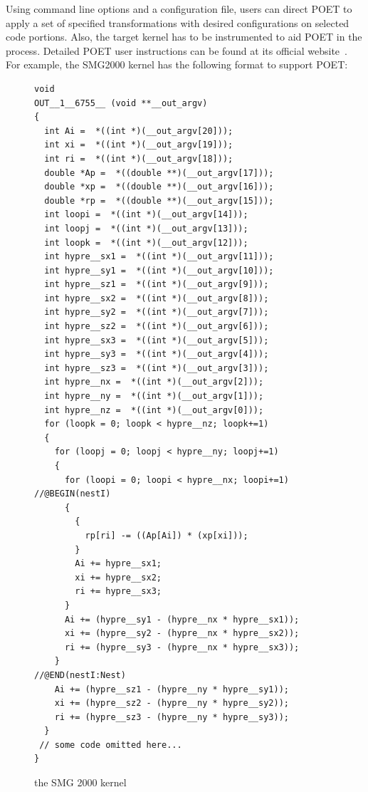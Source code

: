 Using command line options and a configuration file, users can direct POET to apply a set
of specified transformations with desired configurations on selected code portions. 
Also, the target kernel has to be instrumented to aid POET in the process. 
Detailed POET user instructions can be found at its official website~\cite{poetWeb}.
For example, the SMG2000 kernel has the following format to support
POET:
\begin{figure}[!ht]
\centering
\lstset{language=C, basicstyle=\scriptsize}
\begin{lstlisting}
void
OUT__1__6755__ (void **__out_argv)
{
  int Ai =  *((int *)(__out_argv[20]));
  int xi =  *((int *)(__out_argv[19]));
  int ri =  *((int *)(__out_argv[18]));
  double *Ap =  *((double **)(__out_argv[17]));
  double *xp =  *((double **)(__out_argv[16]));
  double *rp =  *((double **)(__out_argv[15]));
  int loopi =  *((int *)(__out_argv[14]));
  int loopj =  *((int *)(__out_argv[13]));
  int loopk =  *((int *)(__out_argv[12]));
  int hypre__sx1 =  *((int *)(__out_argv[11]));
  int hypre__sy1 =  *((int *)(__out_argv[10]));
  int hypre__sz1 =  *((int *)(__out_argv[9]));
  int hypre__sx2 =  *((int *)(__out_argv[8]));
  int hypre__sy2 =  *((int *)(__out_argv[7]));
  int hypre__sz2 =  *((int *)(__out_argv[6]));
  int hypre__sx3 =  *((int *)(__out_argv[5]));
  int hypre__sy3 =  *((int *)(__out_argv[4]));
  int hypre__sz3 =  *((int *)(__out_argv[3]));
  int hypre__nx =  *((int *)(__out_argv[2]));
  int hypre__ny =  *((int *)(__out_argv[1]));
  int hypre__nz =  *((int *)(__out_argv[0]));
  for (loopk = 0; loopk < hypre__nz; loopk+=1) 
  {
    for (loopj = 0; loopj < hypre__ny; loopj+=1) 
    {
      for (loopi = 0; loopi < hypre__nx; loopi+=1)  //@BEGIN(nestI)
      {
        {
          rp[ri] -= ((Ap[Ai]) * (xp[xi]));
        }
        Ai += hypre__sx1;
        xi += hypre__sx2;
        ri += hypre__sx3;
      }
      Ai += (hypre__sy1 - (hypre__nx * hypre__sx1));
      xi += (hypre__sy2 - (hypre__nx * hypre__sx2));
      ri += (hypre__sy3 - (hypre__nx * hypre__sx3));
    }                                             //@END(nestI:Nest)
    Ai += (hypre__sz1 - (hypre__ny * hypre__sy1));
    xi += (hypre__sz2 - (hypre__ny * hypre__sy2));
    ri += (hypre__sz3 - (hypre__ny * hypre__sy3));
  }
 // some code omitted here...
}
\end{lstlisting}
  \caption{the SMG 2000 kernel}
    \label{Fig:smg2000kernel}
\end{figure}
